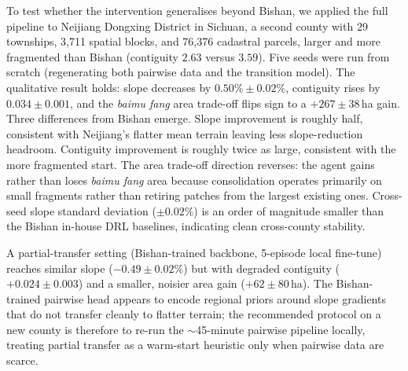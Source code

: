 \documentclass[11pt]{article}
\begin{document}
To test whether the intervention generalises beyond Bishan, we applied the full pipeline to Neijiang Dongxing District in Sichuan, a second county with 29 townships, 3{,}711 spatial blocks, and 76{,}376 cadastral parcels, larger and more fragmented than Bishan (contiguity $2.63$ versus $3.59$). Five seeds were run from scratch (regenerating both pairwise data and the transition model). The qualitative result holds: slope decreases by $0.50\% \pm 0.02\%$, contiguity rises by $0.034 \pm 0.001$, and the \textit{baimu fang} area trade-off flips sign to a $+267 \pm 38$\,ha gain. Three differences from Bishan emerge. Slope improvement is roughly half, consistent with Neijiang's flatter mean terrain leaving less slope-reduction headroom. Contiguity improvement is roughly twice as large, consistent with the more fragmented start. The area trade-off direction reverses: the agent gains rather than loses \textit{baimu fang} area because consolidation operates primarily on small fragments rather than retiring patches from the largest existing ones. Cross-seed slope standard deviation ($\pm 0.02\%$) is an order of magnitude smaller than the Bishan in-house DRL baselines, indicating clean cross-county stability.

A partial-transfer setting (Bishan-trained backbone, 5-episode local fine-tune) reaches similar slope ($-0.49 \pm 0.02\%$) but with degraded contiguity ($+0.024 \pm 0.003$) and a smaller, noisier area gain ($+62 \pm 80$\,ha). The Bishan-trained pairwise head appears to encode regional priors around slope gradients that do not transfer cleanly to flatter terrain; the recommended protocol on a new county is therefore to re-run the $\sim$45-minute pairwise pipeline locally, treating partial transfer as a warm-start heuristic only when pairwise data are scarce.
\end{document}
